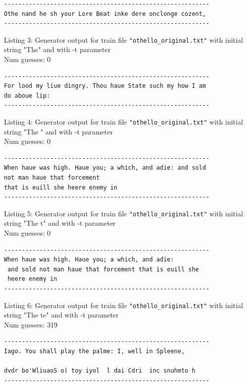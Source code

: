 \documentclass{article}
\begin{document}
\begin{lstlisting}
----------------------------------------------------------
Othe nand he sh your Lore Beat inke dere onclonge cozent,
----------------------------------------------------------
\end{lstlisting}

Listing 3: Generator output for train file \verb|"othello_original.txt"| with initial string "The" and with -t parameter
\\Num guesses: 0

\begin{lstlisting}
----------------------------------------------------------
For lood my liue dingry. Thou haue State such my how I am 
do aboue lip:
----------------------------------------------------------
\end{lstlisting}

Listing 4: Generator output for train file \verb|"othello_original.txt"| with initial string "The " and with -t parameter
\\Num guesses: 0

\begin{lstlisting}
----------------------------------------------------------
When haue was high. Haue you; a which, and adie: and sold 
not man haue that forcement 
that is euill she heere enemy in
----------------------------------------------------------
\end{lstlisting}

Listing 5: Generator output for train file \verb|"othello_original.txt"| with initial string "The t" and with -t parameter
\\Num guesses: 0

\begin{lstlisting}
----------------------------------------------------------
When haue was high. Haue you; a which, and adie:
 and sold not man haue that forcement that is euill she 
 heere enemy in
----------------------------------------------------------
\end{lstlisting}

Listing 6: Generator output for train file \verb|"othello_original.txt"| with initial string "The te" and with -t parameter
\\Num guesses: 319

\begin{lstlisting}
----------------------------------------------------------
Iago. You shall play the palme: I, well in Spleene,

dvdr bo'WliuaoS o( toy iyol  l dai Cdri  inc snuhmto h 
----------------------------------------------------------
\end{lstlisting}
\end{document}
